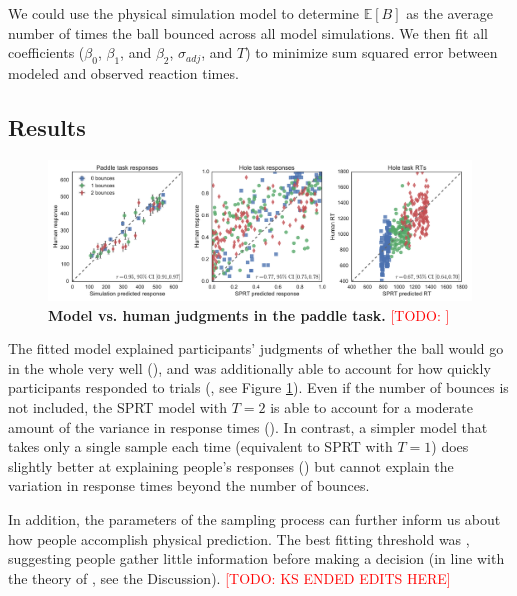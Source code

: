 \documentclass[10pt,letterpaper]{article}
\newcommand{\TODO}[1]{\textcolor{red}{[TODO: #1]}}
\begin{document}
We could use the physical simulation model to determine $\mathbb{E}[B]$ as the average number of times the ball bounced across all model simulations.
We then fit all coefficients ($\beta_0$, $\beta_1$, and $\beta_2$, $\sigma_{adj}$, and $T$) to minimize sum squared error between modeled and observed reaction times.

\subsection{Results}

\begin{figure}[t]
    \begin{center}
        \includegraphics[width=\textwidth]{figures/model_results.pdf}
        \caption{\textbf{Model vs. human judgments in the paddle task.} \TODO{}}
        \label{fig:model-results}
    \end{center}
\end{figure}

The fitted model explained participants' judgments of whether the ball would go in the whole very well (\HoleResponseCorr{}), and was additionally able to account for how quickly participants responded to trials (\HoleRTCorr{}, see Figure \ref{fig:model-results}).
Even if the number of bounces is not included, the SPRT model with $T=2$ is able to account for a moderate amount of the variance in response times (\NoBouncesHoleRTCorr{}).
In contrast, a simpler model that takes only a single sample each time (equivalent to SPRT with $T=1$) does slightly better at explaining people's responses (\RawHoleResponseCorr{}) but cannot explain the variation in response times beyond the number of bounces.

In addition, the parameters of the sampling process can further inform us about how people accomplish physical prediction.
The best fitting threshold was \threshold{}, suggesting people gather little information before making a decision (in line with the theory of \cite{Vul:2014ba}, see the Discussion).
\TODO{KS ENDED EDITS HERE}
\end{document}
